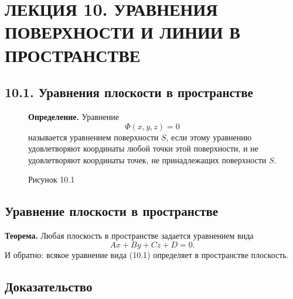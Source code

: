 \documentclass[12pt,a4paper]{article}
\begin{document}
\setcounter{page}{70}

\section*{ЛЕКЦИЯ 10. УРАВНЕНИЯ ПОВЕРХНОСТИ И ЛИНИИ В ПРОСТРАНСТВЕ}

\subsection*{10.1. Уравнения плоскости в пространстве}

\begin{figure}[H]
  \centering
  \begin{minipage}{0.4\textwidth}
    \centering
    \caption*{Рисунок 10.1}
  \end{minipage}%
  \begin{minipage}{0.55\textwidth}
    \textbf{Определение.} Уравнение
    $$
    \Phi(x,y,z)=0
    $$
    называется уравнением поверхности $S$, если этому уравнению
    удовлетворяют координаты любой точки этой поверхности, и не
    удовлетворяют координаты точек, не принадлежащих поверхности $S$.
  \end{minipage}
\end{figure}

\subsection*{\textbf{Уравнение плоскости в пространстве}}

\textbf{Теорема.} Любая плоскость в пространстве задается уравнением вида
\begin{equation}
  Ax+By+Cz+D=0. \tag{10.1}
\end{equation}
И обратно: всякое уравнение вида (10.1) определяет в пространстве плоскость.

\subsection*{\textbf{Доказательство}}
\end{document}
